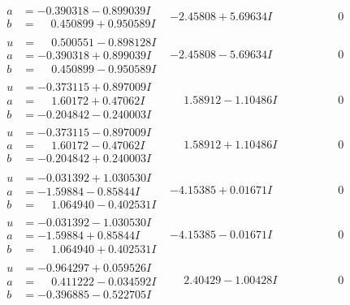 \documentclass[1p]{elsarticle_modified}
\theoremstyle{definition}
\begin{document}
$$\begin{array}{c|c|c}
\begin{aligned}
a &= -0.390318 - 0.899039 I \\
b &= \phantom{-}0.450899 + 0.950589 I\end{aligned}
 & -2.45808 + 5.69634 I & \phantom{-0.000000 } 0 \\ \hline\begin{aligned}
u &= \phantom{-}0.500551 - 0.898128 I \\
a &= -0.390318 + 0.899039 I \\
b &= \phantom{-}0.450899 - 0.950589 I\end{aligned}
 & -2.45808 - 5.69634 I & \phantom{-0.000000 } 0 \\ \hline\begin{aligned}
u &= -0.373115 + 0.897009 I \\
a &= \phantom{-}1.60172 + 0.47062 I \\
b &= -0.204842 - 0.240003 I\end{aligned}
 & \phantom{-}1.58912 - 1.10486 I & \phantom{-0.000000 } 0 \\ \hline\begin{aligned}
u &= -0.373115 - 0.897009 I \\
a &= \phantom{-}1.60172 - 0.47062 I \\
b &= -0.204842 + 0.240003 I\end{aligned}
 & \phantom{-}1.58912 + 1.10486 I & \phantom{-0.000000 } 0 \\ \hline\begin{aligned}
u &= -0.031392 + 1.030530 I \\
a &= -1.59884 - 0.85844 I \\
b &= \phantom{-}1.064940 - 0.402531 I\end{aligned}
 & -4.15385 + 0.01671 I & \phantom{-0.000000 } 0 \\ \hline\begin{aligned}
u &= -0.031392 - 1.030530 I \\
a &= -1.59884 + 0.85844 I \\
b &= \phantom{-}1.064940 + 0.402531 I\end{aligned}
 & -4.15385 - 0.01671 I & \phantom{-0.000000 } 0 \\ \hline\begin{aligned}
u &= -0.964297 + 0.059526 I \\
a &= \phantom{-}0.411222 - 0.034592 I \\
b &= -0.396885 - 0.522705 I\end{aligned}
 & \phantom{-}2.40429 - 1.00428 I & \phantom{-0.000000 } 0 \\ \hline\begin{aligned}

\end{aligned}
\end{array}$$
\end{document}
